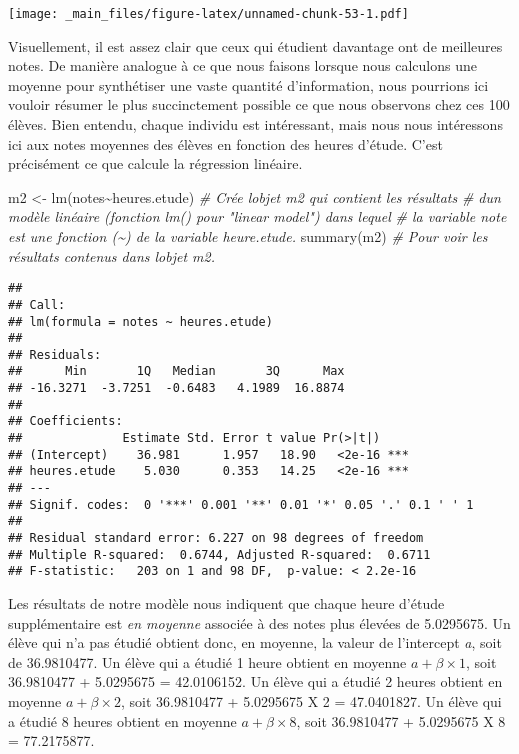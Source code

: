 \documentclass[
]{book}
\newenvironment{Shaded}{\begin{snugshade}}{\end{snugshade}}
\newcommand{\CommentTok}[1]{\textcolor[rgb]{0.56,0.35,0.01}{\textit{#1}}}
\newcommand{\FunctionTok}[1]{\textcolor[rgb]{0.00,0.00,0.00}{#1}}
\newcommand{\NormalTok}[1]{#1}
\newcommand{\OtherTok}[1]{\textcolor[rgb]{0.56,0.35,0.01}{#1}}
\newcommand{\SpecialCharTok}[1]{\textcolor[rgb]{0.00,0.00,0.00}{#1}}
\begin{document}
\texttt{[image: \_main\_files/figure-latex/unnamed-chunk-53-1.pdf]}

Visuellement, il est assez clair que ceux qui étudient davantage ont de meilleures notes. De manière analogue à ce que nous faisons lorsque nous calculons une moyenne pour synthétiser une vaste quantité d'information, nous pourrions ici vouloir résumer le plus succinctement possible ce que nous observons chez ces 100 élèves. Bien entendu, chaque individu est intéressant, mais nous nous intéressons ici aux notes moyennes des élèves en fonction des heures d'étude. C'est précisément ce que calcule la régression linéaire.

\begin{Shaded}
\begin{Highlighting}[]
\NormalTok{m2 }\OtherTok{\textless{}{-}} \FunctionTok{lm}\NormalTok{(notes}\SpecialCharTok{\textasciitilde{}}\NormalTok{heures.etude) }\CommentTok{\# Crée l\textquotesingle{}objet m2 qui contient les résultats}
\CommentTok{\# d\textquotesingle{}un modèle linéaire (fonction lm() pour "linear model") dans lequel }
\CommentTok{\# la variable note est une fonction (\textasciitilde{}) de la variable heure.etude. }
\FunctionTok{summary}\NormalTok{(m2) }\CommentTok{\# Pour voir les résultats contenus dans l\textquotesingle{}objet m2.}
\end{Highlighting}
\end{Shaded}

\begin{verbatim}
## 
## Call:
## lm(formula = notes ~ heures.etude)
## 
## Residuals:
##      Min       1Q   Median       3Q      Max 
## -16.3271  -3.7251  -0.6483   4.1989  16.8874 
## 
## Coefficients:
##              Estimate Std. Error t value Pr(>|t|)    
## (Intercept)    36.981      1.957   18.90   <2e-16 ***
## heures.etude    5.030      0.353   14.25   <2e-16 ***
## ---
## Signif. codes:  0 '***' 0.001 '**' 0.01 '*' 0.05 '.' 0.1 ' ' 1
## 
## Residual standard error: 6.227 on 98 degrees of freedom
## Multiple R-squared:  0.6744, Adjusted R-squared:  0.6711 
## F-statistic:   203 on 1 and 98 DF,  p-value: < 2.2e-16
\end{verbatim}

Les résultats de notre modèle nous indiquent que chaque heure d'étude supplémentaire est \emph{en moyenne} associée à des notes plus élevées de 5.0295675. Un élève qui n'a pas étudié obtient donc, en moyenne, la valeur de l'intercept \emph{a}, soit de 36.9810477. Un élève qui a étudié 1 heure obtient en moyenne \(a + \beta \times 1\), soit 36.9810477 + 5.0295675 = 42.0106152. Un élève qui a étudié 2 heures obtient en moyenne \(a + \beta \times 2\), soit 36.9810477 + 5.0295675 X 2 = 47.0401827. Un élève qui a étudié 8 heures obtient en moyenne \(a + \beta \times 8\), soit 36.9810477 + 5.0295675 X 8 = 77.2175877.
\end{document}
